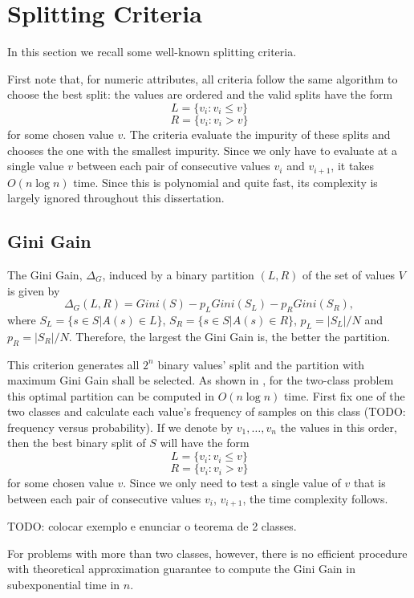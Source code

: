 \section{Splitting Criteria}
In this section we recall some well-known splitting criteria.

First note that, for numeric attributes, all criteria follow the same algorithm to choose the best split: the values are ordered and the valid splits have the form 
$$L = \{v_i : v_i \leq v\}$$
$$R = \{v_i : v_i > v\}$$
for some chosen value $v$. The criteria evaluate the impurity of these splits and chooses the one with the smallest impurity. Since we only have to evaluate at a single value $v$ between each pair of consecutive values $v_i$ and $v_{i+1}$, it takes $O(n \log n)$ time. Since this is polynomial and quite fast, its complexity is largely ignored throughout this dissertation.

\subsection{Gini Gain}

The Gini Gain, $\Delta_G$, induced by a binary partition $(L,R)$ 
of the set of values $V$ is
given by 
\begin{equation}
 \Delta_G (L,R) = Gini(S) -
p_L Gini(S_L) - p_R Gini(S_R),
\label{eq:Ginigain}
\end{equation}
where $S_L= \{ s \in S | A(s) \in L \}$, $S_R= \{ s \in S | A(s) \in R \}$,
 $p_L=|S_L| /N $
and $p_R=|S_R| /N$. Therefore, the largest the Gini Gain is, the better the partition.

This criterion generates all $2^n$ binary values' split and the partition with maximum Gini Gain shall be selected.
As shown in \cite{Breiman84}, for the two-class problem this optimal partition  
can be computed  in $O(n \log n)$ time. First fix one of the two classes and calculate each value's frequency of samples on this class (TODO: frequency versus probability).
If we denote by $v_1,\ldots,v_n$ the values in this order, then the best binary split of $S$ will have the form 
$$L = \{v_i : v_i \leq v\}$$
$$R = \{v_i : v_i > v\}$$
for some chosen value $v$. Since we only need to test a single value of $v$ that is between each pair of consecutive values $v_i$, $v_{i+1}$, the time complexity follows.

TODO: colocar exemplo e enunciar o teorema de 2 classes.

For problems with more than two classes, however, there is no efficient procedure with theoretical approximation guarantee to compute the Gini Gain in subexponential time in $n$.

